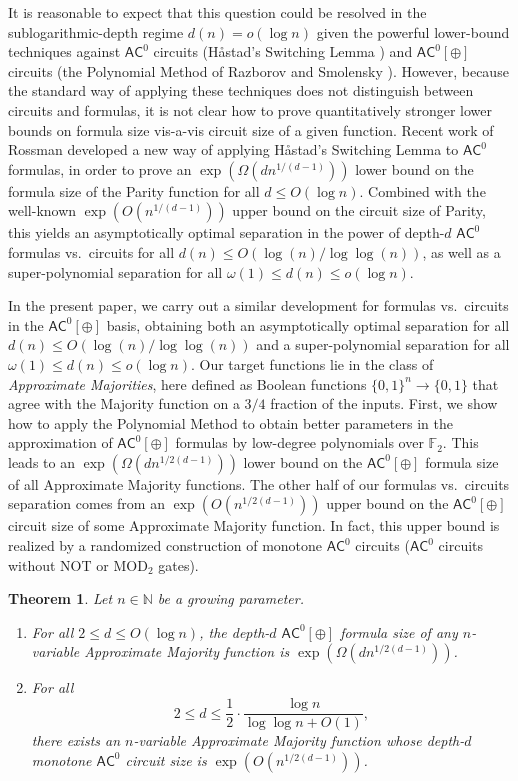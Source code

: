 \documentclass[11pt]{article}
\numberwithin{equation}{section}
\newtheorem{theorem}{Theorem}[section]
\theoremstyle{definition}
\theoremstyle{plain}
\newcommand{\cclass}[1]{\textsf{#1}}
\newcommand{\F}{\mathbb{F}}
\newcommand{\AC}{\cclass{AC}}
\begin{document}
It is reasonable to expect that this question could be resolved in the
%
sublogarithmic-depth  %
regime
%
$d(n) = o(\log n)$     %
given the powerful
%
lower-bound   %
techniques against $\AC^0$ circuits (H{\aa}stad's
Switching Lemma \cite{Hastad}) and $\AC^0[\oplus]$ circuits 
(the Polynomial Method of Razborov \cite{Razborov} and
Smolensky \cite{Smolensky87}). However, because the standard way
of applying these techniques does not distinguish between circuits
and formulas, it is not clear how to prove quantitatively stronger 
lower bounds on formula size vis-a-vis circuit size of a given function. 
Recent work of Rossman \cite{Rossman2015average} developed a new way of 
applying H{\aa}stad's Switching Lemma to $\AC^0$ formulas, in order to 
prove an $\exp(\Omega(dn^{1/(d-1)}))$ lower bound on the formula size 
of the Parity function for all $d \le O(\log n)$. Combined with the 
well-known $\exp(O(n^{1/(d-1)}))$ upper bound on the circuit size of 
Parity, this yields an asymptotically optimal separation in the 
power of depth-$d$ $\AC^0$ formulas vs.\ circuits for all 
$d(n) \le O({\log(n)}/{\log\log(n)})$, as well as a 
super-polynomial separation for all $\omega(1) \le d(n) \le o(\log n)$.

In the present paper, we carry out a similar development for formulas vs.\ circuits in the $\AC^0[\oplus]$ basis, obtaining both an asymptotically optimal separation for all $d(n) \le O({\log(n)}/{\log\log(n)})$ and a super-polynomial separation for all $\omega(1) \le d(n) \le o(\log n)$. Our target functions lie in the class of
\emph{Approximate Majorities}, here defined as Boolean 
functions $\{0,1\}^n \to \{0,1\}$ that  %
agree with  %
the Majority function on
a   %
$3/4$ fraction of
the  %
inputs. 
First, we show how to apply the Polynomial Method to obtain better parameters in the approximation of $\AC^0[\oplus]$ formulas by low-degree polynomials over $\F_2$. This leads to an $\exp(\Omega(dn^{1/2(d-1)}))$ lower bound on the $\AC^0[\oplus]$ formula size of all Approximate Majority functions. The other half of our formulas vs.\ circuits separation comes from an $\exp(O(n^{1/2(d-1)}))$ upper bound on the $\AC^0[\oplus]$ circuit size of some Approximate Majority function. In fact, this upper bound is realized by a randomized construction of monotone $\AC^0$ circuits
%
%
($\AC^0$ circuits without NOT or MOD$_2$ gates).   %



\begin{theorem}\label{thm:main}
Let $n \in \mathbb N$ be a growing parameter.
\begin{enumerate}
\item
For all $2 \le d \le O(\log n)$, the depth-$d$ $\AC^0[\oplus]$ formula size of any $n$-variable Approximate Majority function is $\exp(\Omega(dn^{1/2(d-1)}))$.
\item
  For all
  \[
    2 \le d \le \frac{1}{2}\cdot \frac{\log n}{\log\log n + O(1)},
  \]
  there exists an $n$-variable Approximate Majority function whose
  depth-$d$ monotone $\AC^0$ circuit size is $\exp(O(n^{1/2(d-1)}))$.
\end{enumerate}
\end{theorem}
\end{document}
